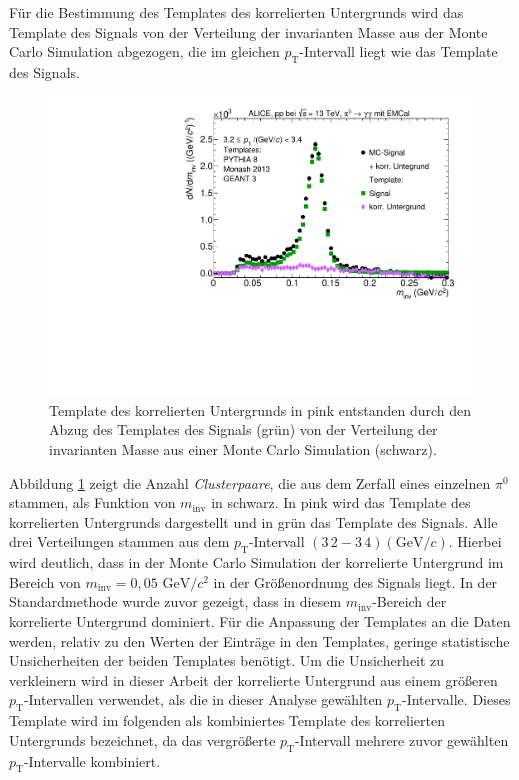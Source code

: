 Für die Bestimmung des Templates des korrelierten Untergrunds wird das Template des Signals von der Verteilung der invarianten Masse aus der Monte Carlo Simulation abgezogen, die im gleichen $p_\text{T}$-Intervall liegt wie das Template des Signals.
\begin{figure}[tp]
\centering
\includegraphics[width=.75\linewidth]{EntstehungUntergrund10_Data_2016.pdf}
\caption{Template des korrelierten Untergrunds in pink entstanden durch den Abzug des Templates des Signals (grün) von der Verteilung der invarianten Masse aus einer Monte Carlo Simulation (schwarz).}
\label{fig:BkgTemp}
\end{figure}
\newline
Abbildung \ref{fig:BkgTemp} zeigt die Anzahl \textit{Clusterpaare}, die aus dem Zerfall eines einzelnen $\pi^{0}$ stammen, als Funktion von $m_\text{inv}$ in schwarz.
In pink wird das Template des korrelierten Untergrunds dargestellt und in grün das Template des Signals.
Alle drei Verteilungen stammen aus dem $p_\text{T}$-Intervall $(3\,2 - 3\,4) (\text{GeV/}c)$.
Hierbei wird deutlich, dass in der Monte Carlo Simulation der korrelierte Untergrund im Bereich von $m_\text{inv} = 0,05 \text{ GeV/}c^{2}$ in der Größenordnung des Signals liegt.
In der Standardmethode wurde zuvor gezeigt, dass in diesem $m_\text{inv}$-Bereich der korrelierte Untergrund dominiert.
\newline
Für die Anpassung der Templates an die Daten werden, relativ zu den Werten der Einträge in den Templates, geringe statistische Unsicherheiten der beiden Templates benötigt.
Um die Unsicherheit zu verkleinern wird in dieser Arbeit der korrelierte Untergrund aus einem größeren $p_\text{T}$-Intervallen verwendet, als die in dieser Analyse gewählten $p_\text{T}$-Intervalle.
Dieses Template wird im folgenden als kombiniertes Template des korrelierten Untergrunds bezeichnet, da das vergrößerte $p_\text{T}$-Intervall mehrere zuvor gewählten $p_\text{T}$-Intervalle kombiniert.
